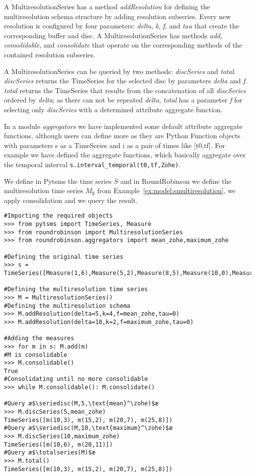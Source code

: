 A MultiresolutionSeries has a method \emph{addResolution} for defining
the multiresolution schema structure by adding resolution
subseries. Every new resolution is configured by four parameters:
\emph{delta}, \emph{k}, \emph{f}, and \emph{tau} that create the
corresponding buffer and disc.  A MultiresolutionSeries has methods
\emph{add}, \emph{consolidable}, and \emph{consolidate} that operate on
the corresponding methods of the contained resolution subseries.


A MultiresolutionSeries can be queried by two methods:
\emph{discSeries} and \emph{total}. \emph{discSeries} returns the
TimeSeries for the selected disc by parameters \emph{delta} and
\emph{f}. \emph{total} returns the TimeSeries that results from the
concatenation of all \emph{discSeries} ordered by \emph{delta}; as
there can not be repeated \emph{delta}, \emph{total} has a parameter
\emph{f} for selecting only \emph{discSeries} with a determined
attribute aggregate function.

In a module \emph{aggregators} we have implemented some default
attribute aggregate functions, although users can define more as they
are Python Function objects with parameters s as a TimeSeries and i as
a pair of times like [t0,tf]. For example we have defined the \zohe
aggregate functions, which basically aggregate over the temporal
interval \lstinline[style=py]+s.interval_temporal(t0,tf,Zohe)+.


\begin{example}
  We define in Pytsms the time series $S$ and in RoundRobinson we
  define the multiresolution time series $M_\emptyset$ from
  Example~\ref{ex:model:smultiresolution}, we apply consolidation and
  we query the result.

\begin{lstlisting}[style=py]
#Importing the required objects
>>> from pytsms import TimeSeries, Measure
>>> from roundrobinson import MultiresolutionSeries
>>> from roundrobinson.aggregators import mean_zohe,maximum_zohe

#Defining the original time series
>>> s = TimeSeries([Measure(1,6),Measure(5,2),Measure(8,5),Measure(10,0),Measure(14,1),Measure(19,6),Measure(22,11),Measure(26,6),Measure(29,0)])

#Defining the multiresolution time series
>>> M = MultiresolutionSeries()
#Defining the multiresolution schema
>>> M.addResolution(delta=5,k=4,f=mean_zohe,tau=0)
>>> M.addResolution(delta=10,k=2,f=maximum_zohe,tau=0)

#Adding the measures
>>> for m in s: M.add(m)
#M is consolidable
>>> M.consolidable()
True
#Consolidating until no more consolidable
>>> while M.consolidable(): M.consolidate()

#Query æ$\seriedisc(M,5,\text{mean}^\zohe)$æ
>>> M.discSeries(5,mean_zohe)
TimeSeries([m(10,3), m(15,2), m(20,7), m(25,8)])
#Query æ$\seriedisc(M,10,\text{maximum}^\zohe)$æ
>>> M.discSeries(10,maximum_zohe)
TimeSeries([m(10,6), m(20,11)])
#Query æ$\totalseries(M)$æ
>>> M.total()
TimeSeries([m(10,3), m(15,2), m(20,7), m(25,8)])
\end{lstlisting}
\end{example}



